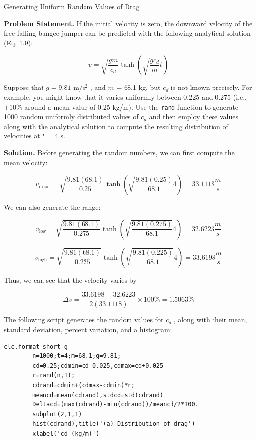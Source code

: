 \documentclass[../main.tex]{subfiles}
\begin{document}
\begin{example} Generating Uniform Random Values of Drag

	\noindent \textbf{Problem Statement. } \quad  If the initial velocity is zero, the downward velocity of the free-falling
	bungee jumper can be predicted with the following analytical solution (Eq. 1.9):

	$$
		v= \sqrt{\frac{gm}{c_d} } \tanh \left(\sqrt{\frac{gc_d}{m} t}\right)
	$$

	\noindent Suppose that $g = 9.81$ m/s$^2$ , and $m$ = 68.1 kg, but $c_d$ is not known precisely. For example,
	you might know that it varies uniformly between 0.225 and 0.275 (i.e., $\pm 10\%$ around a
	mean value of 0.25 kg/m). Use the \texttt{rand} function to generate 1000 random uniformly
	distributed values of $c_d$ and then employ these values along with the analytical solution to
	compute the resulting distribution of velocities at $t$ = 4 s.

	\noindent \textbf{Solution. } \quad  Before generating the random numbers, we can first compute the mean velocity:

	$$
		v_{\text{mean}} = \sqrt{\frac{9.81(68.1)}{0.25}} \tanh \left(\sqrt{\frac{9.81(0.25)}{68.1}} 4 \right) = 33.1118 \frac{m}{s}
	$$

	\noindent We can also generate the range:

	$$
		v_{\text{low}} = \sqrt{\frac{9.81(68.1)}{0.275}} \tanh \left(\sqrt{\frac{9.81(0.275)}{68.1}} 4 \right) = 32.6223 \frac{m}{s}
	$$

	$$
		v_{\text{high}} = \sqrt{\frac{9.81(68.1)}{0.225}} \tanh \left(\sqrt{\frac{9.81(0.225)}{68.1}} 4 \right) = 33.6198 \frac{m}{s}
	$$

	\noindent Thus, we can see that the velocity varies by

	$$
		\Delta v = \frac{33.6198 - 32.6223}{2(33.1118)} \times 100 \% = 1.5063\%
	$$

	\noindent The following script generates the random values for $c_d$ , along with their mean, standard
	deviation, percent variation, and a histogram:

	\begin{lstlisting}[numbers=none]
		clc,format short g
		n=1000;t=4;m=68.1;g=9.81;
		cd=0.25;cdmin=cd-0.025,cdmax=cd+0.025
		r=rand(n,1);
		cdrand=cdmin+(cdmax-cdmin)*r;
		meancd=mean(cdrand),stdcd=std(cdrand)
		Deltacd=(max(cdrand)-min(cdrand))/meancd/2*100.
		subplot(2,1,1)
		hist(cdrand),title('(a) Distribution of drag')
		xlabel('cd (kg/m)')
	\end{lstlisting}


\end{example}
\end{document}
